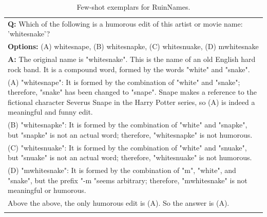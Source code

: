 \begin{table}[H]
    \caption{Few-shot exemplars for RuinNames.}
    \label{tab:reasoningprompt}
    \centering
    \begin{tabularx}{\columnwidth}{@{}X@{}}
        \toprule
        \textbf{Q:} Which of the following is a humorous edit of this artist or movie name: 'whitesnake'? \\
        \textbf{Options:} (A) whitesnape, (B) whitesnapke, (C) whitesnuake, (D) mwhitesnake \\
        \textbf{A:} The original name is "whitesnake". This is the name of an old English hard rock band. It is a compound word, formed by the words "white" and "snake". \\
        (A) "whitesnape": It is formed by the combination of "white" and "snake"; therefore, "snake" has been changed to "snape". Snape makes a reference to the fictional character Severus Snape in the Harry Potter series, so (A) is indeed a meaningful and funny edit. \\
        (B) "whitesnapke": It is formed by the combination of "white" and "snapke", but "snapke" is not an actual word; therefore, "whitesnapke" is not humorous. \\
        (C) "whitesnuake": It is formed by the combination of "white" and "snuake", but "snuake" is not an actual word; therefore, "whitesnuake" is not humorous. \\
        (D) "mwhitesnake": It is formed by the combination of "m", "white", and "snake", but the prefix "-m "seems arbitrary; therefore, "mwhitesnake" is not meaningful or humorous. \\
        Above the above, the only humorous edit is (A). So the answer is (A). \\\\
        

\end{tabularx}
\end{table}
